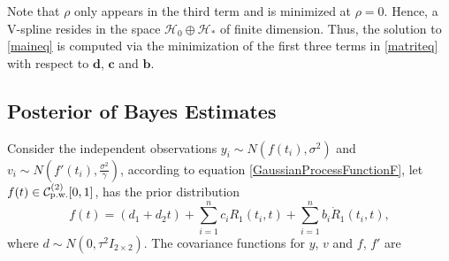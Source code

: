 Note that $\rho$ only appears in the third term and is minimized at $\rho=0$. Hence, a V-spline resides in the space $\mathcal{H}_0\oplus \mathcal{H}_*$ of finite dimension. Thus, the solution to \eqref{maineq} is computed via the minimization of the first three terms in \eqref{matriteq} with respect to $\mathbf{d}$, $\mathbf{c}$ and $\mathbf{b}$.



\subsection{Posterior of Bayes Estimates}


Consider the independent observations $y_i\sim N\left(f(t_i),\sigma^2 \right)$ and $v_i\sim N\left(f'(t_i),\frac{\sigma^2}{\gamma} \right)$, 
according to equation \eqref{GaussianProcessFunctionF}, let $f(t) \in \mathcal{C}_{\mbox{\scriptsize p.w.}}^{(2)}[0,1]$, has the prior distribution 
\begin{equation}
f(t)=(d_1+d_2t)+\sum_{i=1}^{n}c_iR_1(t_i,t)+\sum_{i=1}^{n}b_i\dot{R}_1(t_i,t),
\end{equation}
where $d\sim N(0,\tau^2I_{2\times 2})$. The covariance functions for $y$, $v$ and $f$, $f'$ are \small
